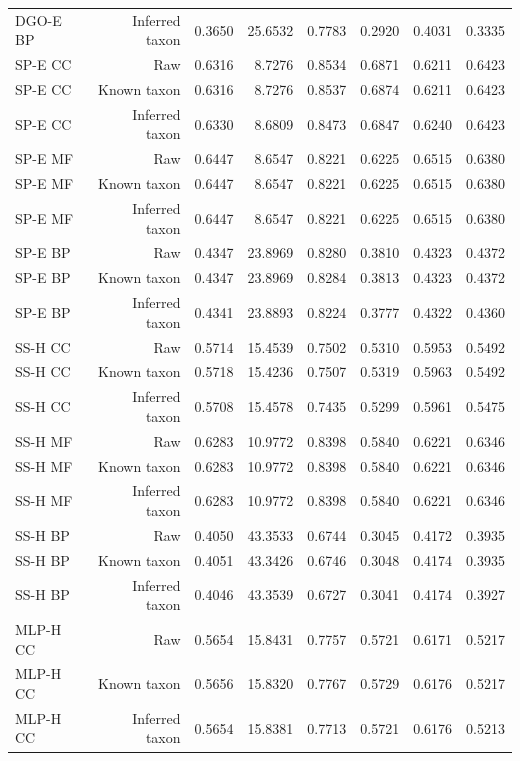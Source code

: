 \begin{longtable}{lrrrrrrr}
DGO-E BP & Inferred taxon & 0.3650 & 25.6532 & 0.7783 & 0.2920 & 0.4031 & 0.3335 \\
SP-E CC & Raw & 0.6316 & 8.7276 & 0.8534 & 0.6871 & 0.6211 & 0.6423 \\
SP-E CC & Known taxon & 0.6316 & 8.7276 & 0.8537 & 0.6874 & 0.6211 & 0.6423 \\
SP-E CC & Inferred taxon & 0.6330 & 8.6809 & 0.8473 & 0.6847 & 0.6240 & 0.6423 \\
SP-E MF & Raw & 0.6447 & 8.6547 & 0.8221 & 0.6225 & 0.6515 & 0.6380 \\
SP-E MF & Known taxon & 0.6447 & 8.6547 & 0.8221 & 0.6225 & 0.6515 & 0.6380 \\
SP-E MF & Inferred taxon & 0.6447 & 8.6547 & 0.8221 & 0.6225 & 0.6515 & 0.6380 \\
SP-E BP & Raw & 0.4347 & 23.8969 & 0.8280 & 0.3810 & 0.4323 & 0.4372 \\
SP-E BP & Known taxon & 0.4347 & 23.8969 & 0.8284 & 0.3813 & 0.4323 & 0.4372 \\
SP-E BP & Inferred taxon & 0.4341 & 23.8893 & 0.8224 & 0.3777 & 0.4322 & 0.4360 \\
SS-H CC & Raw & 0.5714 & 15.4539 & 0.7502 & 0.5310 & 0.5953 & 0.5492 \\
SS-H CC & Known taxon & 0.5718 & 15.4236 & 0.7507 & 0.5319 & 0.5963 & 0.5492 \\
SS-H CC & Inferred taxon & 0.5708 & 15.4578 & 0.7435 & 0.5299 & 0.5961 & 0.5475 \\
SS-H MF & Raw & 0.6283 & 10.9772 & 0.8398 & 0.5840 & 0.6221 & 0.6346 \\
SS-H MF & Known taxon & 0.6283 & 10.9772 & 0.8398 & 0.5840 & 0.6221 & 0.6346 \\
SS-H MF & Inferred taxon & 0.6283 & 10.9772 & 0.8398 & 0.5840 & 0.6221 & 0.6346 \\
SS-H BP & Raw & 0.4050 & 43.3533 & 0.6744 & 0.3045 & 0.4172 & 0.3935 \\
SS-H BP & Known taxon & 0.4051 & 43.3426 & 0.6746 & 0.3048 & 0.4174 & 0.3935 \\
SS-H BP & Inferred taxon & 0.4046 & 43.3539 & 0.6727 & 0.3041 & 0.4174 & 0.3927 \\
MLP-H CC & Raw & 0.5654 & 15.8431 & 0.7757 & 0.5721 & 0.6171 & 0.5217 \\
MLP-H CC & Known taxon & 0.5656 & 15.8320 & 0.7767 & 0.5729 & 0.6176 & 0.5217 \\
MLP-H CC & Inferred taxon & 0.5654 & 15.8381 & 0.7713 & 0.5721 & 0.6176 & 0.5213 \\

\end{longtable}
